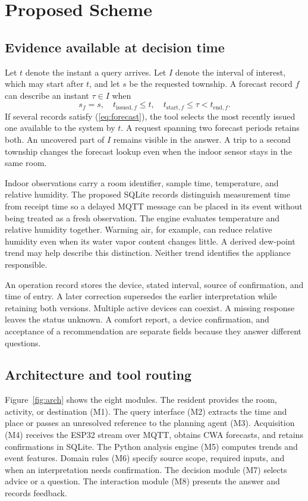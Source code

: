 \documentclass[conference]{IEEEtran}
\begin{document}
\section{Proposed Scheme}\label{sec:method}
\subsection{Evidence available at decision time}
Let $t$ denote the instant a query arrives. Let $I$ denote the interval of interest, which may start after $t$, and let $s$ be the requested township. A forecast record $f$ can describe an instant $\tau\in I$ when
\begin{equation}
s_f=s,\quad t_{\mathrm{issued},f}\leq t,\quad
t_{\mathrm{start},f}\leq\tau<t_{\mathrm{end},f}.
\label{eq:forecast}
\end{equation}
If several records satisfy (\ref{eq:forecast}), the tool selects the most recently issued one available to the system by $t$. A request spanning two forecast periods retains both. An uncovered part of $I$ remains visible in the answer. A trip to a second township changes the forecast lookup even when the indoor sensor stays in the same room.

Indoor observations carry a room identifier, sample time, temperature, and relative humidity. The proposed SQLite records distinguish measurement time from receipt time so a delayed MQTT message can be placed in its event without being treated as a fresh observation. The engine evaluates temperature and relative humidity together. Warming air, for example, can reduce relative humidity even when its water vapor content changes little. A derived dew-point trend may help describe this distinction. Neither trend identifies the appliance responsible.

An operation record stores the device, stated interval, source of confirmation, and time of entry. A later correction supersedes the earlier interpretation while retaining both versions. Multiple active devices can coexist. A missing response leaves the status unknown. A comfort report, a device confirmation, and acceptance of a recommendation are separate fields because they answer different questions.

\subsection{Architecture and tool routing}
Figure~\ref{fig:arch} shows the eight modules. The resident provides the room, activity, or destination (M1). The query interface (M2) extracts the time and place or passes an unresolved reference to the planning agent (M3). Acquisition (M4) receives the ESP32 stream over MQTT, obtains CWA forecasts, and retains confirmations in SQLite. The Python analysis engine (M5) computes trends and event features. Domain rules (M6) specify source scope, required inputs, and when an interpretation needs confirmation. The decision module (M7) selects advice or a question. The interaction module (M8) presents the answer and records feedback.
\end{document}
